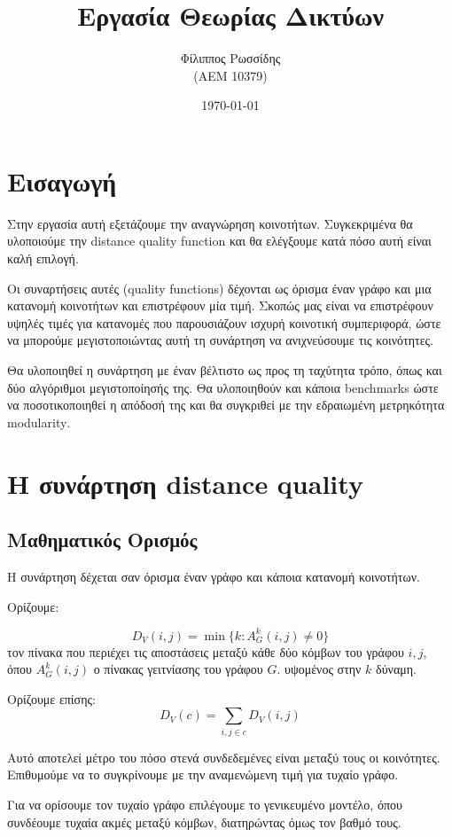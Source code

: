 \documentclass[12pt, letterpaper]{article}
\title{Εργασία Θεωρίας Δικτύων }
\author{Φίλιππος Ρωσσίδης \\ (ΑΕΜ 10379)}
\date{\today}
\begin{document}
\maketitle

\section{Εισαγωγή}

Στην εργασία αυτή εξετάζουμε την αναγνώρηση κοινοτήτων. Συγκεκριμένα θα 
υλοποιούμε την 
\textlatin{distance quality function} και θα ελέγξουμε κατά πόσο αυτή είναι καλή
επιλογή. 

Οι συναρτήσεις αυτές (\textlatin{quality functions}) δέχονται ως όρισμα έναν
γράφο και μια κατανομή κοινοτήτων και επιστρέφουν μία τιμή. Σκοπώς μας είναι 
να επιστρέφουν υψηλές τιμές για κατανομές που παρουσιάζουν ισχυρή κοινοτική συμπεριφορά,
ώστε να μπορούμε μεγιστοποιώντας αυτή τη συνάρτηση να ανιχνεύσουμε τις κοινότητες.

Θα υλοποιηθεί η συνάρτηση με έναν βέλτιστο ως προς τη ταχύτητα τρόπο, όπως και δύο αλγόριθμοι μεγιστοποίησής της. Θα υλοποιηθούν 
και κάποια \textlatin{benchmarks} ώστε να ποσοτικοποιηθεί η απόδοσή της και θα συγκριθεί με την εδραιωμένη μετρηκότητα \textlatin{modularity}.


\section{Η συνάρτηση \textlatin{distance quality}}

\subsection{Μαθηματικός Ορισμός}

Η συνάρτηση δέχεται σαν όρισμα έναν γράφο και κάποια κατανομή κοινοτήτων.

Ορίζουμε:

\[ D_V(i,j) = \min \{ k:A^k_G (i,j) \neq 0 \} \]
τον πίνακα που περιέχει τις αποστάσεις μεταξύ κάθε δύο κόμβων του γράφου 
$i,j$, όπου $A^k_G(i,j)$ ο πίνακας γειτνίασης του γράφου $G$. υψομένος στην $k$
δύναμη. 

Ορίζουμε επίσης:
\[ D_V(c) = \sum_{i,j \in c} D_V(i,j) \]

Αυτό αποτελεί μέτρο του πόσο στενά συνδεδεμένες είναι μεταξύ τους 
οι κοινότητες. Επιθυμούμε να το συγκρίνουμε με την αναμενώμενη τιμή 
για τυχαίο γράφο.

Για να ορίσουμε τον τυχαίο γράφο επιλέγουμε το γενικευμένο μοντέλο,
όπου συνδέουμε τυχαία ακμές μεταξύ κόμβων, διατηρώντας όμως τον βαθμό τους.
\end{document}
